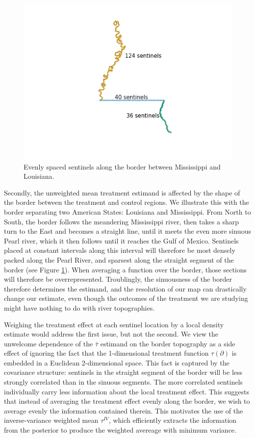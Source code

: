 \documentclass[letter]{article}
\makeatletter
\def\maxwidth{\ifdim\Gin@nat@width>\linewidth\linewidth
\else\Gin@nat@width\fi}
\let\Oldincludegraphics\includegraphics
\renewcommand{\includegraphics}[1]{\Oldincludegraphics[width=.8\maxwidth]{#1}}
\newcommand{\boundary}{\partial}
\newcommand{\linavg}{\bar{\tau}}
\newcommand{\invvar}{\tau^{IV}}
\makeatother
\begin{document}
\begin{figure}
\centering
\includegraphics{figures/mississippi_counts.png}
\caption{\label{fig:mississippi_counts} Evenly spaced sentinels along
the border between Mississippi and Louisiana.}
\end{figure}

Secondly, the unweighted mean treatment estimand is affected by the
shape of the border between the treatment and control regions. We
illustrate this with the border separating two American States:
Louisiana and Mississippi. From North to South, the border follows the
meandering Mississippi river, then takes a sharp turn to the East and
becomes a straight line, until it meets the even more sinuous Pearl
river, which it then follows until it reaches the Gulf of Mexico.
Sentinels placed at constant intervals along this interval will
therefore be most densely packed along the Pearl River, and sparsest
along the straight segment of the border (see Figure
\ref{fig:mississippi_counts}). When averaging a function over the
border, those sections will therefore be overrepresented. Troublingly,
the sinuousness of the border therefore determines the estimand, and the
resolution of our map can drastically change our estimate, even though
the outcomes of the treatment we are studying might have nothing to do
with river topographies.

Weighing the treatment effect at each sentinel location by a local
density estimate would address the first issue, but not the second. We
view the unwelcome dependence of the \(\linavg\) estimand on the border
topography as a side effect of ignoring the fact that the 1-dimensional
treatment function \(\tau(\boundary)\) is embedded in a Euclidean
2-dimensional space. This fact is captured by the covariance structure:
sentinels in the straight segment of the border will be less strongly
correlated than in the sinuous segments. The more correlated sentinels
individually carry less information about the local treatment effect.
This suggests that instead of averaging the treatment effect evenly
along the border, we wish to average evenly the information contained
therein. This motivates the use of the inverse-variance weighted mean
\(\invvar\), which efficiently extracts the information from the
posterior to produce the weighted avereage with minimum variance.
\end{document}
